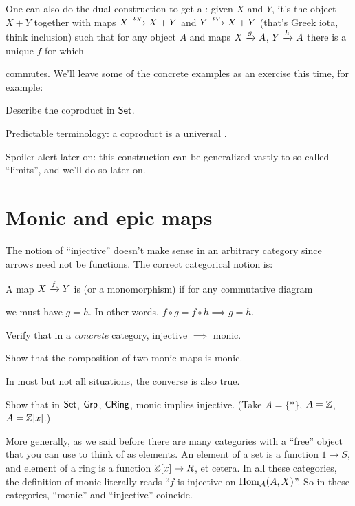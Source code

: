 One can also do the dual construction to get a :
given $X$ and $Y$, it's the object $X+Y$
together with maps $X \xrightarrow{\iota_X} X+Y$ and $Y \xrightarrow{\iota_Y} X+Y$
(that's Greek iota, think inclusion)
such that for any object $A$ and maps $X \xrightarrow{g} A$, $Y \xrightarrow{h} A$
there is a unique $f$ for which
\begin{center}
\end{center}
commutes.
We'll leave some of the concrete examples as an exercise this time,
for example:
\begin{exercise}
	Describe the coproduct in $\mathsf{Set}$.
\end{exercise}
Predictable terminology: a coproduct is a universal .

Spoiler alert later on:
this construction can be generalized vastly to so-called ``limits'',
and we'll do so later on.

\section{Monic and epic maps}
The notion of ``injective'' doesn't make sense
in an arbitrary category since arrows need not be functions.
The correct categorical notion is:
\begin{definition}
	A map $X \xrightarrow{f} Y$ is 
	(or a monomorphism) if for any commutative diagram
	\begin{center}
	\end{center}
	we must have $g = h$.
	In other words, $f \circ g = f \circ h \implies g = h$.
\end{definition}
\begin{ques}
	Verify that in a \emph{concrete} category, injective $\implies$ monic.
\end{ques}
\begin{ques}
	Show that the composition of two monic maps is monic.
\end{ques}

In most but not all situations, the converse is also true.
\begin{exercise}
	Show that in $\mathsf{Set}$, $\mathsf{Grp}$, $\mathsf{CRing}$,
	monic implies injective. (Take $A = \{\ast\}$, $A = \mathbb Z$, $A = \mathbb Z[x]$.)
\end{exercise}
More generally, as we said before there are many categories
with a ``free'' object that you can use to think of as elements.
An element of a set is a function $1 \to S$,
and element of a ring is a function $\mathbb Z[x] \to R$, et cetera.
In all these categories,
the definition of monic literally reads
``$f$ is injective on $\operatorname{Hom}_\mathcal A(A, X)$''.
So in these categories, ``monic'' and ``injective'' coincide.

